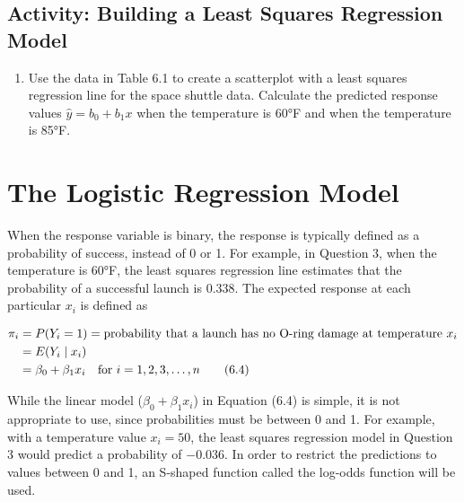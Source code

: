 \documentclass[
]{book}
\providecommand{\tightlist}{%
  \setlength{\itemsep}{0pt}\setlength{\parskip}{0pt}}
\begin{document}
\hypertarget{activity-building-a-least-squares-regression-model}{%
\subsection*{Activity: Building a Least Squares Regression Model}\label{activity-building-a-least-squares-regression-model}}

\begin{enumerate}
\def\labelenumi{\arabic{enumi}.}
\setcounter{enumi}{2}
\tightlist
\item
  Use the data in Table 6.1 to create a scatterplot with a least squares regression line for the space shuttle data. Calculate the predicted response values \(\hat y = b_0 + b_1 x\) when the temperature is 60°F and when the temperature is 85°F.
\end{enumerate}

\hypertarget{the-logistic-regression-model}{%
\section{The Logistic Regression Model}\label{the-logistic-regression-model}}

When the response variable is binary, the response is typically defined as a probability of success, instead of 0 or 1. For example, in Question 3, when the temperature is 60°F, the least squares regression line estimates that the probability of a successful launch is 0.338. The expected response at each particular \(x_i\) is defined as

\begin{align}
\pi_i &= P(Y_i = 1) = \text{probability that a launch has no O-ring damage at temperature } x_i \notag \\
      &= E(Y_i \mid x_i) \notag \\
      &= \beta_0 + \beta_1 x_i \quad \text{for } i = 1,2,3,\dots,n \tag{6.4}
\end{align}

While the linear model (\(\beta_0 + \beta_1 x_i\)) in Equation (6.4) is simple, it is not appropriate to use, since probabilities must be between 0 and 1. For example, with a temperature value \(x_i = 50\), the least squares regression model in Question 3 would predict a probability of \(-0.036\). In order to restrict the predictions to values between 0 and 1, an S-shaped function called the log-odds function will be used.
\end{document}
